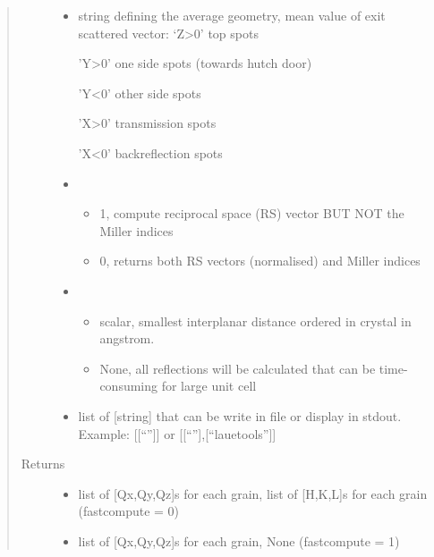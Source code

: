 \documentclass[letterpaper,10pt,english]{sphinxmanual}
\begin{document}
\begin{fulllineitems}
\begin{quote}
\begin{description}
\begin{itemize}
\item {} 
 \textendash{} 
string defining the average geometry, mean value of exit scattered vector:
‘Z\textgreater{}0’   top spots

’Y\textgreater{}0’   one side spots (towards hutch door)

’Y\textless{}0’   other side spots

’X\textgreater{}0’   transmission spots

’X\textless{}0’   backreflection spots


\item {} 
 \textendash{} \begin{itemize}
\item {} 
1, compute reciprocal space (RS) vector BUT NOT the Miller indices

\item {} 
0, returns both RS vectors (normalised) and Miller indices

\end{itemize}


\item {} 
 \textendash{} \begin{itemize}
\item {} 
scalar, smallest interplanar distance ordered in crystal in angstrom.

\item {} 
None, all reflections will be calculated that can be time-consuming for large unit cell

\end{itemize}


\item {} 
 \textendash{} list of {[}string{]} that can be write in file or display in
stdout. Example: {[}{[}“”{]}{]} or {[}{[}“\sphinxstylestrong{******}”{]},{[}“lauetools”{]}{]}

\end{itemize}

\item[{Returns}] \leavevmode
\begin{itemize}
\item {} 
list of {[}Qx,Qy,Qz{]}s for each grain, list of {[}H,K,L{]}s for each grain (fastcompute = 0)

\item {} 
list of {[}Qx,Qy,Qz{]}s for each grain, None  (fastcompute = 1)


\end{itemize}
\end{description}
\end{quote}
\end{fulllineitems}
\end{document}
